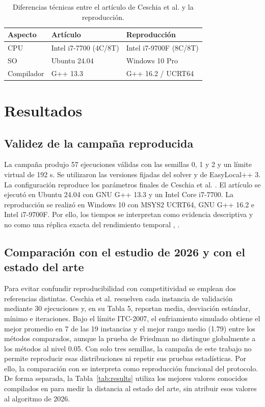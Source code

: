 \documentclass[journal]{IEEEtran}
\begin{document}
\begin{table}[!t]
\caption{Diferencias técnicas entre el artículo de Ceschia et al. \cite{ref18} y la reproducción.}
\label{tab:entorno}
\centering
\footnotesize
\begin{tabular}{p{} p{} p{}}
\toprule
\textbf{Aspecto} & \textbf{Artículo} & \textbf{Reproducción}\\
\midrule
CPU & Intel i7-7700 (4C/8T) & Intel i7-9700F (8C/8T)\\
SO & Ubuntu 24.04 & Windows 10 Pro\\
Compilador & G++ 13.3 & G++ 16.2 / UCRT64\\
\bottomrule
\end{tabular}
\end{table}

\section{Resultados}

\subsection{Validez de la campaña reproducida}

La campaña produjo 57 ejecuciones válidas con las semillas 0, 1 y 2 y un límite virtual de 192 s. Se utilizaron las versiones fijadas del solver y de EasyLocal++ 3. La configuración reproduce los parámetros finales de Ceschia et al. \cite{ref18}. El artículo se ejecutó en Ubuntu 24.04 con GNU G++ 13.3 y un Intel Core i7-7700. La reproducción se realizó en Windows 10 con MSYS2 UCRT64, GNU G++ 16.2 e Intel i7-9700F. Por ello, los tiempos se interpretan como evidencia descriptiva y no como una réplica exacta del rendimiento temporal \cite{ref18}, \cite{ref20}.


\subsection{Comparación con el estudio de 2026 y con el estado del arte}

Para evitar confundir reproducibilidad con competitividad se emplean dos referencias distintas. Ceschia et al. \cite{ref18} resuelven cada instancia de validación mediante 30 ejecuciones y, en su Tabla 5, reportan media, desviación estándar, mínimo e iteraciones. Bajo el límite ITC-2007, el enfriamiento simulado obtiene el mejor promedio en 7 de las 19 instancias y el mejor rango medio (1.79) entre los métodos comparados, aunque la prueba de Friedman no distingue globalmente a los métodos al nivel 0.05. Con solo tres semillas, la campaña de este trabajo no permite reproducir esas distribuciones ni repetir sus pruebas estadísticas. Por ello, la comparación con \cite{ref18} se interpreta como reproducción funcional del protocolo. De forma separada, la Tabla~\ref{tab:results} utiliza los mejores valores conocidos compilados en \cite{ref2} para medir la distancia al estado del arte, sin atribuir esos valores al algoritmo de 2026.
\end{document}
